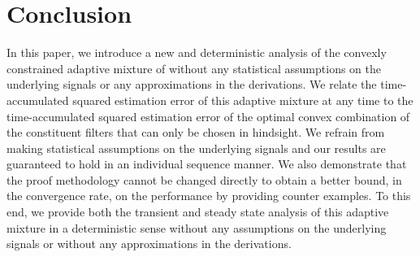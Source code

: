 \documentclass[journal]{IEEEtran}
\begin{document}
\section{Conclusion}
\label{sec:conclusion}
In this paper, we introduce a new and deterministic analysis of the
convexly constrained adaptive mixture of \cite{convex} without any
statistical assumptions on the underlying signals or any
approximations in the derivations. We relate the time-accumulated
squared estimation error of this adaptive mixture at any time to the
time-accumulated squared estimation error of the optimal convex
combination of the constituent filters that can only be chosen in
hindsight. We refrain from making statistical assumptions on the
underlying signals and our results are guaranteed to hold in an
individual sequence manner. We also demonstrate that the proof
methodology cannot be changed directly to obtain a better bound, in
the convergence rate, on the performance by providing counter
examples. To this end, we provide both the transient and steady state
analysis of this adaptive mixture in a deterministic sense without any
assumptions on the underlying signals or without any approximations in
the derivations.  

\end{document}
